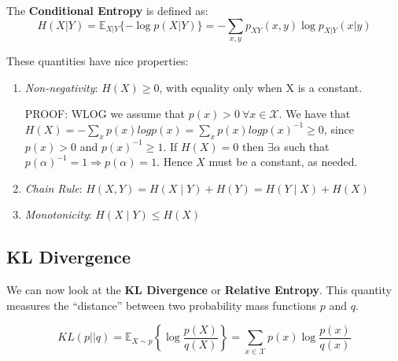\documentclass[]{article}
\theoremstyle{mattstyle}
\theoremstyle{definition}
\begin{document}
The \textbf{Conditional Entropy} is defined as:
\begin{equation}
H(X|Y) = \mathbb{E}_{X|Y}\{-\log p(X|Y)\} = -\sum_{x,y}p_{XY}(x,y)\log p_{X|Y}(x|y)
\end{equation}

These quantities have nice properties:
\begin{enumerate}
	\item \emph{Non-negativity}: \(H(X)\ge0\), with equality only when X is a constant.
	
	PROOF: WLOG we assume that \(p(x)>0 \ \forall x\in\mathcal{X}\). We have that \(H(X) = -\sum_{x} p(x)logp(x) = \sum_{x} p(x)logp(x)^{-1}\ge0\), since \(p(x)>0\) and \(p(x)^{-1} \ge 1\). If \(H(X)=0\) then \(\exists \alpha\) such that \(p(\alpha)^{-1}=1 \Rightarrow p(\alpha)=1\). Hence \(X\) must be a constant, as needed.
	
	\item \emph{Chain Rule}: $H(X,Y) = H(X \mid Y) + H(Y) = H(Y \mid X) + H(X)$ 
	\item \emph{Monotonicity}: $H(X\mid Y) \le H(X)$ 
\end{enumerate}

\subsection{KL Divergence}
We can now look at the \textbf{KL Divergence} or \textbf{Relative Entropy}. This quantity measures the ``distance'' between two probability mass functions $p$ and $q$.

\begin{equation}
KL(p||q) = \mathbb{E}_{X\sim p}\left\{\log \frac{p(X)}{q(X)}\right\} = \sum_{x\in\mathcal{X}}p(x)\log\frac{p(x)}{q(x)}
\end{equation}
\end{document}
